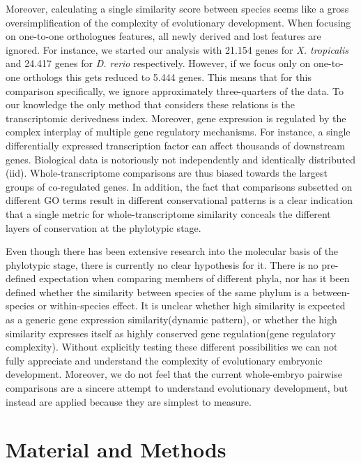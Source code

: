 Moreover, calculating a single similarity score between species seems like a gross oversimplification of the complexity of evolutionary development. When focusing on one-to-one orthologues features, all newly derived and lost features are ignored. For instance, we started our analysis with 21.154 genes for \textit{X. tropicalis} and 24.417 genes for \textit{D. rerio} respectively. However, if we focus only on one-to-one orthologs this gets reduced to 5.444 genes. This means that for this comparison specifically, we ignore approximately three-quarters of the data. To our knowledge the only method that considers these relations is the transcriptomic derivedness index\cite{Leong2021}. Moreover, gene expression is regulated by the complex interplay of multiple gene regulatory mechanisms. For instance, a single differentially expressed transcription factor can affect thousands of downstream genes. Biological data is notoriously not independently and identically distributed (iid). Whole-transcriptome comparisons are thus biased towards the largest groups of co-regulated genes. In addition, the fact that comparisons subsetted on different GO terms result in different conservational patterns is a clear indication that a single metric for whole-transcriptome similarity conceals the different layers of conservation at the phylotypic stage\cite{Malik2017,Gildor2019,Onimaru2021}.

Even though there has been extensive research into the molecular basis of the phylotypic stage, there is currently no clear hypothesis for it. There is no pre-defined expectation when comparing members of different phyla, nor has it been defined whether the similarity between species of the same phylum is a between-species or within-species effect. It is unclear whether high similarity is expected as a generic gene expression similarity(dynamic pattern), or whether the high similarity expresses itself as highly conserved gene regulation(gene regulatory complexity). Without explicitly testing these different possibilities we can not fully appreciate and understand the complexity of evolutionary embryonic development. Moreover, we do not feel that the current whole-embryo pairwise comparisons are a sincere attempt to understand evolutionary development, but instead are applied because they are simplest to measure. 

\section{Material and Methods}

